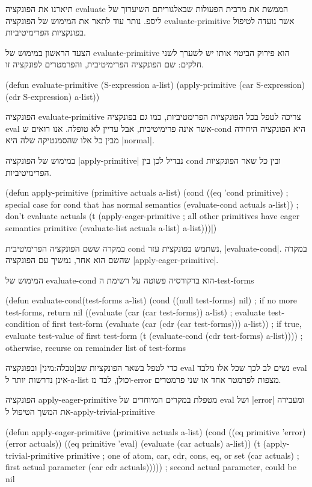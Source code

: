 תיארנו את הפונקציה evaluate הממשת את מרבית הפעולות שבאלגוריתם השיערוך של ליספ.
נותר עוד לתאר את המימוש של הפונקציה evaluate-primitive אשר נועדה לטיפול
בפונקציות הפרימיטיביות.

הצעד הראשון במימוש של evaluate-primitive הוא פירוק הביטוי אותו יש לשערך לשני
חלקים: שם הפונקציה הפרימיטיבית, והפרמטרים לפונקציה זו.
\begin{KERNEL}
(defun evaluate-primitive (S-expression a-list)
  (apply-primitive (car S-expression) (cdr S-expression) a-list))
\end{KERNEL}

הפונקציה
evaluate-primitive צריכה לטפל בכל הפונקציות הפרימטיביות, כמו גם בפונקציה eval
אשר אינה פרימיטיבית, אבל עדיין לא טופלה. אנו רואים ש-cond היא הפונקציה היחידה
מבין כל אלו שהסמנטיקה
שלה היא \E|normal|.

\minipage\textwidth
במימוש של הפונקציה \E|apply-primitive| נבדיל לכן בין cond ובין כל שאר הפונקציות
הפרימיטיביות.
\begin{KERNEL}
(defun apply-primitive (primitive actuals a-list)
  (cond ((eq 'cond primitive) ; special case for cond that has normal semantics
            (evaluate-cond actuals a-list)) ; don't evaluate actuals
        (t (apply-eager-primitive ; all other primitives have eager semantics
              primitive
              (evaluate-list actuals a-list)
              a-list)))|)
\end{KERNEL}
\endminipage

במקרה ששם הפונקציה הפרימיטיבית cond נשתמש בפונקצית עזר, \E|evaluate-cond|. במקרה
שהשם הוא אחר, נמשיך עם הפונקציה \E|apply-eager-primitive|.

המימוש של evaluate-cond הוא ברקורסיה פשוטה על רשימת ה-test-forms
\begin{KERNEL}
(defun evaluate-cond(test-forms a-list)
  (cond ((null test-forms) nil) ; if no more test-forms, return nil
        ((evaluate (car (car test-forms)) a-list) ; evaluate test-condition of first test-form
        (evaluate (car (cdr (car test-forms))) a-list)) ; if true, evaluate test-value of first test-form
        (t (evaluate-cond (cdr test-forms) a-list)))) ; otherwise, recurse on remainder list of test-forms
\end{KERNEL}

כדי לטפל בשאר הפונקציות שב|טבלה:מיני| ובפונקציה eval נשים לב לכך שכל אלו
מלבד eval אינן נדרשות יותר ל-a-list וכולן, לבד מ-error מצפות לפרמטר אחד או שני פרמטרים.

הפונקציה apply-eager-primitive מטפלת במקרים המיוחדים של eval ושל \E|error|
ומעבירה את המשך הטיפול ל-apply-trivial-primitive
\begin{KERNEL}
(defun apply-eager-primitive (primitive actuals a-list)
  (cond ((eq primitive 'error) (error actuals))
        ((eq primitive 'eval) (evaluate (car actuals) a-list))
        (t (apply-trivial-primitive
              primitive ; one of atom, car, cdr, cons, eq, or set
              (car actuals) ; first actual parameter
              (car cdr actuals))))) ; second actual parameter, could be nil
\end{KERNEL}

